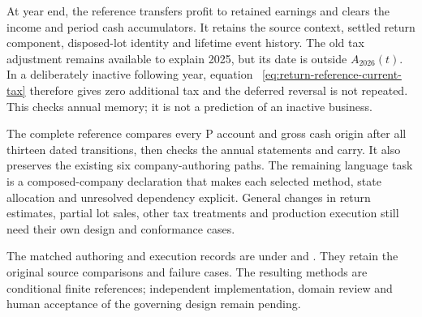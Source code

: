 At year end, the reference transfers profit to retained earnings and clears
the income and period cash accumulators. It retains the source context,
settled return component, disposed-lot identity and lifetime event history.
The old tax adjustment remains available to explain 2025, but its date is
outside $A_{2026}(t)$. In a deliberately inactive following year, equation~
\eqref{eq:return-reference-current-tax} therefore gives zero additional tax
and the deferred reversal is not repeated. This checks annual memory; it is
not a prediction of an inactive business.

The complete reference compares every P account and gross cash origin after
all thirteen dated transitions, then checks the annual statements and carry.
It also preserves the existing six company-authoring paths. The remaining
language task is a composed-company declaration that makes each selected
method, state allocation and unresolved dependency explicit. General changes
in return estimates, partial lot sales, other tax treatments and production
execution still need their own design and conformance cases.

The matched authoring and execution records are under
 and
. They retain
the original source comparisons and failure cases. The resulting methods are
conditional finite references; independent implementation, domain review and
human acceptance of the governing design remain pending.
